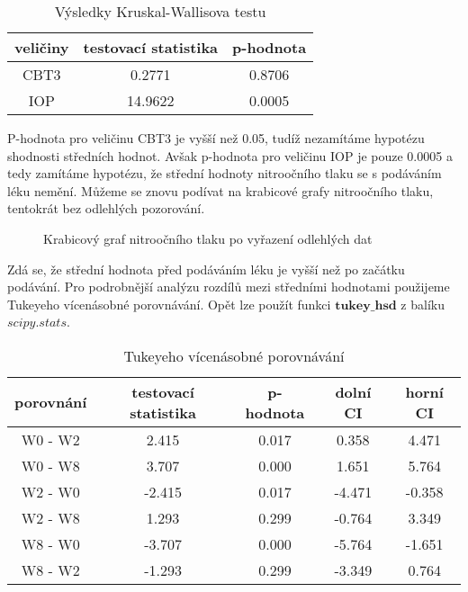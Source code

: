 \documentclass{article}
\begin{document}
\begin{table}[H]
  \small
  \centering
  \caption{Výsledky Kruskal-Wallisova testu}
  \begin{tabular}{|ccc|}
    \hline
    veličiny & testovací statistika & p-hodnota\\
    \hline
    CBT3 & 0.2771 & 0.8706\\
    IOP & 14.9622 & 0.0005\\
    \hline
  \end{tabular}
\end{table}

P-hodnota pro veličinu CBT3 je vyšší než 0.05, tudíž nezamítáme hypotézu shodnosti středních hodnot.
Avšak p-hodnota pro veličinu IOP je pouze 0.0005 a tedy zamítáme hypotézu, že střední hodnoty nitroočního tlaku se s podáváním léku nemění.
Můžeme se znovu podívat na krabicové grafy nitroočního tlaku, tentokrát bez odlehlých pozorování.

\begin{figure}[H]
  \centering
    
    \caption{Krabicový graf nitroočního tlaku po vyřazení odlehlých dat}
\end{figure}

Zdá se, že střední hodnota před podáváním léku je vyšší než po začátku podávání.
Pro podrobnější analýzu rozdílů mezi středními hodnotami použijeme Tukeyeho vícenásobné porovnávání.
Opět lze použít funkci $\mathbf{tukey\_hsd}$ z balíku $scipy.stats$.

\begin{table}[H]
  \small
  \centering 
  \caption{Tukeyeho vícenásobné porovnávání}
  \begin{tabular}{|ccccc|}
    \hline
    porovnání & testovací statistika & p-hodnota & dolní CI & horní CI\\
    \hline
    W0 - W2 & 2.415 & 0.017 & 0.358 & 4.471\\
    W0 - W8 & 3.707 & 0.000 & 1.651 & 5.764\\
    W2 - W0 & -2.415 & 0.017 & -4.471 & -0.358\\
    W2 - W8 & 1.293   & 0.299  &  -0.764  &   3.349\\
    W8 - W0  &   -3.707   &  0.000  &  -5.764 &   -1.651\\
    W8 - W2   &  -1.293  &   0.299   & -3.349   &  0.764\\
    \hline
  \end{tabular}
\end{table}
\end{document}
